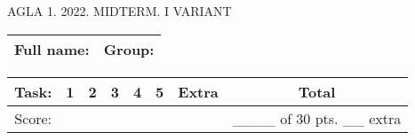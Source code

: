 \documentclass[]{exam}
\begin{document}
% 


\centering 

AGLA 1. 2022. MIDTERM. I VARIANT
\bigskip
\large

\begin{tabular}[b]{p{10cm}|p{2cm}}
    Full name: & Group: \\ \hline
\end{tabular}
\bigskip

\begin{tabular}[b]{|c|c|c|c|c|c|c|c|}
    \hline
    Task: & 1 & 2 & 3 & 4 & 5 & Extra & Total \\ \hline
    Score: &  &  &  &  &  & & \_\_\_\_ of 30 pts. \_\_  extra \\ \hline
\end{tabular}
\end{document}
